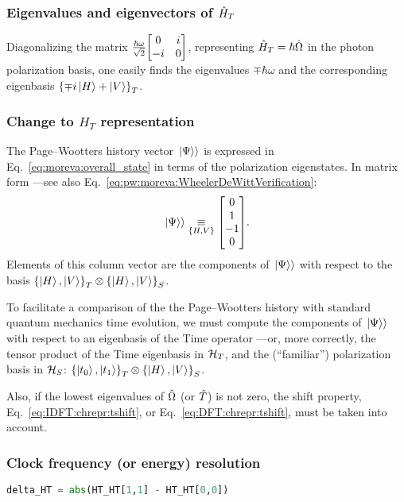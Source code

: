 \subsubsection*{Eigenvalues and eigenvectors of $\hat{H}_T$}

Diagonalizing the matrix $\frac{\hbar\omega}{\sqrt{2}}\mqty[0 &i\\-i &0]$,
representing $\hat{H}_T = \hbar\hat{\Omega}$ in the photon polarization basis,
one easily finds the eigenvalues $\mp\hbar\omega$ and the corresponding eigenbasis
$\left\{\mp i \ket{H} + \ket{V}\right\}_T$.

\subsubsection*{Change to $H_T$ representation}

The Page--Wootters history vector $\left.\left| \Psi \right\rangle\right\rangle$ is expressed in Eq.~\eqref{eq:moreva:overall_state}
in terms of the polarization eigenstates. In matrix form ---see also Eq.~\eqref{eq:pw:moreva:WheelerDeWittVerification}:
\begin{equation}
  \dket{\Psi} \repr[\setof{H, V}] \mqty[0 \\ 1 \\ -1 \\ 0] \text{.}
\end{equation}
Elements of this column vector are the components of $\left.\left| \Psi \right\rangle\right\rangle$
with respect to the basis $\left\{\ket{H}, \ket{V}\right\}_T \otimes \left\{\ket{H}, \ket{V}\right\}_S$.

To facilitate a comparison of the the Page--Wootters history with standard quantum mechanics time evolution,
we must compute the components of $\left.\left| \Psi \right\rangle\right\rangle$ with respect to an eigenbasis of the Time operator
---or, more correctly, the tensor product of the Time eigenbasis in $\mathcal{H}_T$,
and the (``familiar'') polarization basis in $\mathcal{H}_S$: $\left\{\ket{t_0}, \ket{t_1}\right\}_T \otimes \left\{\ket{H}, \ket{V}\right\}_S$.

Also, if the lowest eigenvalues of $\hat{\Omega}$ (or $\hat{T}$) is not zero,
the shift property, Eq.~\eqref{eq:IDFT:chrepr:tshift}, or Eq.~\eqref{eq:DFT:chrepr:tshift},
must be taken into account.

\subsubsection*{Clock frequency (or energy) resolution}

\begin{lstlisting}[language=Python]
delta_HT = abs(HT_HT[1,1] - HT_HT[0,0])
\end{lstlisting}

